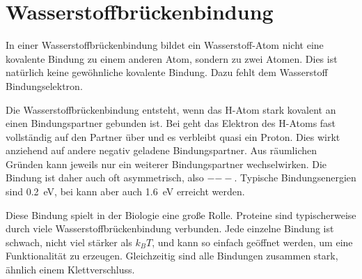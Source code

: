 \section{Wasserstoffbrückenbindung}

In einer Wasserstoffbrückenbindung bildet ein Wasserstoff-Atom nicht eine kovalente Bindung zu einem anderen Atom, sondern zu zwei Atomen. Dies ist natürlich keine gewöhnliche kovalente Bindung. Dazu fehlt dem Wasserstoff  Bindungselektron.

Die Wasserstoffbrückenbindung entsteht, wenn das H-Atom stark kovalent an einen Bindungspartner gebunden ist. Bei geht das Elektron des H-Atoms fast vollständig auf den Partner über und es verbleibt quasi ein Proton. Dies wirkt anziehend auf andere negativ geladene Bindungspartner. Aus räumlichen Gründen kann jeweils nur ein weiterer Bindungspartner wechselwirken. Die Bindung ist daher auch oft asymmetrisch, also $-$$--$. Typische Bindungsenergien sind 0.2~eV, bei  kann aber auch 1.6~eV erreicht werden.

Diese Bindung spielt in der Biologie eine große Rolle. Proteine sind typischerweise durch viele Wasserstoffbrückenbindung verbunden. Jede einzelne Bindung ist schwach, nicht viel stärker als $k_B T$, und kann so einfach geöffnet werden, um eine Funktionalität zu erzeugen. Gleichzeitig sind alle Bindungen zusammen stark, ähnlich einem Klettverschluss.









\printbibliography[segment=\therefsegment,heading=subbibliography]
